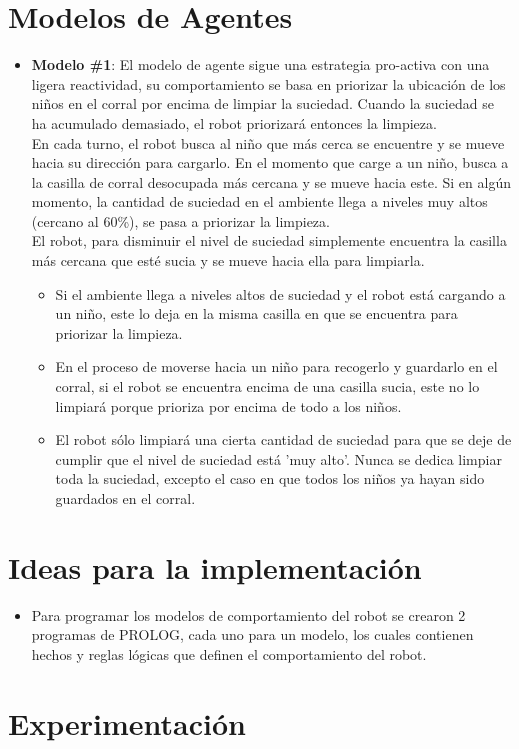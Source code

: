 \documentclass[12pt]{article}
\begin{document}
\section{Modelos de Agentes}
\begin{itemize}
	\item \textbf{Modelo \#1}:
	El modelo de agente sigue una estrategia pro-activa con una ligera
	reactividad, 
	su comportamiento se basa en priorizar la ubicaci\'on de los ni\~nos en el 
	corral por encima de limpiar la suciedad. Cuando la suciedad se
	ha acumulado demasiado, el robot priorizar\'a entonces la 
	limpieza.\\
	En cada turno, el robot busca al ni\~no que m\'as cerca se encuentre 
	y se mueve hacia su direcci\'on para cargarlo. En el momento que carge
	a un ni\~no, busca a la casilla de corral desocupada m\'as cercana y 
	se mueve hacia este. Si en alg\'un momento, la cantidad de suciedad en el
	ambiente llega a 	niveles muy altos (cercano al 60\%), se pasa a priorizar
	la limpieza.\\
	El robot, para disminuir el nivel de suciedad simplemente encuentra la 
	casilla m\'as cercana que est\'e sucia y se mueve hacia ella para limpiarla.
	\begin{itemize} \textit{Algunos detalles sobre este modelo:}
		\item Si el ambiente llega a niveles altos de suciedad y el robot 
		est\'a cargando a un ni\~no, este lo deja en la misma casilla en que se
		encuentra para priorizar la limpieza.
		\item En el proceso de moverse hacia un ni\~no para recogerlo y guardarlo
		en el corral, si el robot se encuentra encima de una casilla sucia, este 
		no lo limpiar\'a porque prioriza por encima de todo a los ni\~nos.
		\item El robot s\'olo limpiar\'a una cierta cantidad de suciedad para que
		se deje de cumplir que el nivel de suciedad est\'a 'muy alto'. Nunca se 
		dedica limpiar toda la suciedad, excepto el caso en que todos los ni\~nos
		ya hayan sido guardados en el corral.
	\end{itemize}
\end{itemize}

\section{Ideas para la implementaci\'on}
	\begin{itemize}
		\item Para programar los modelos de comportamiento del robot se crearon
		2 programas de PROLOG, cada uno para un modelo, los cuales contienen 
		hechos y reglas l\'ogicas que definen el comportamiento del robot.
	\end{itemize}
\section{Experimentaci\'on}
\end{document}
